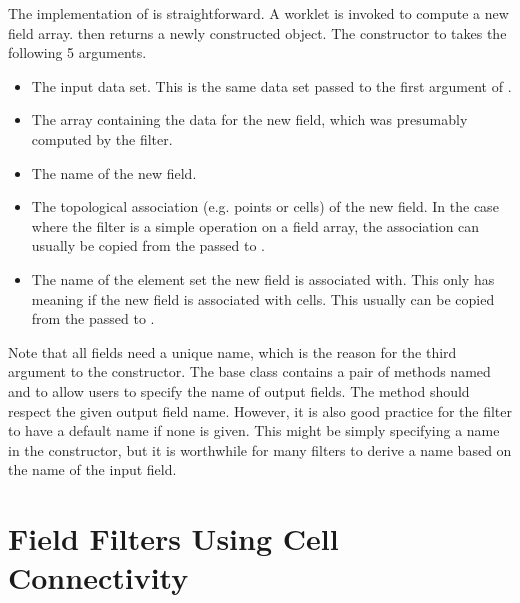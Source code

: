 The implementation of  is straightforward.
A worklet is invoked to compute a new field array.
 then returns a newly constructed  object.
The constructor to  takes the following 5 arguments.
\begin{itemize}
\item
  The input data set.
  This is the same data set passed to the first argument of .
\item
  The array containing the data for the new field, which was presumably computed by the filter.
\item
  The name of the new field.
\item
  The topological association (e.g. points or cells) of the new field.
  In the case where the filter is a simple operation on a field array, the association can usually be copied from the  passed to .
\item
  The name of the element set the new field is associated with.
  This only has meaning if the new field is associated with cells.
  This usually can be copied from the  passed to .
\end{itemize}

Note that all fields need a unique name, which is the reason for the third argument to the  constructor.
The  base class contains a pair of methods named  and  to allow users to specify the name of output fields.
The  method should respect the given output field name.
However, it is also good practice for the filter to have a default name if none is given.
This might be simply specifying a name in the constructor, but it is worthwhile for many filters to derive a name based on the name of the input field.



\section{Field Filters Using Cell Connectivity}


